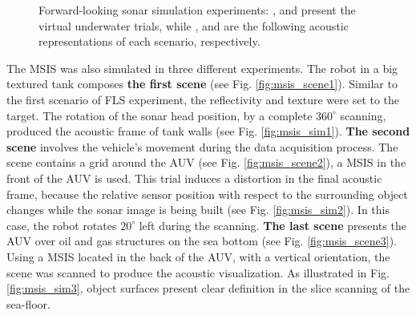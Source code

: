 \documentclass[final,5p,times]{elsarticle}
\begin{document}
\begin{figure}[!ht]
{        \label{fig:fls_sim2}
    }
    \captionsetup{justification=centering}
    \caption{Forward-looking sonar simulation experiments:
    ,  and 
    present the virtual underwater trials, while ,
     and  are the following acoustic
    representations of each scenario, respectively.}
    \label{fig:fls}
\end{figure}

The MSIS was also simulated in three different experiments. The robot in a
big textured tank composes \textbf{the first scene} (see Fig.
\ref{fig:msis_scene1}). Similar to the first scenario of FLS experiment,
the reflectivity and texture were set to the target. The rotation of the
sonar head position, by a complete $360^{\circ}$ scanning, produced the acoustic
frame of tank walls (see Fig. \ref{fig:msis_sim1}). \textbf{The second scene}
involves the vehicle's movement during the data acquisition process. The scene
contains a grid around the AUV (see Fig. \ref{fig:msis_scene2}), a MSIS in
the front of the AUV is used. This trial induces a distortion in the final
acoustic frame, because the relative sensor position with respect to the
surrounding object changes while the sonar image is being built (see
Fig. \ref{fig:msis_sim2}). In this case, the robot rotates $20^{\circ}$ left
during the scanning. \textbf{The last scene} presents the AUV over oil
and gas structures on the sea bottom (see Fig. \ref{fig:msis_scene3}).
Using a MSIS located in the back of the AUV, with a vertical orientation,
the scene was scanned to produce the acoustic visualization. As illustrated
in Fig. \ref{fig:msis_sim3}, object surfaces present clear definition in
the slice scanning of the sea-floor.
\end{document}
